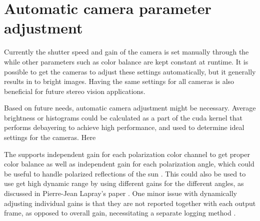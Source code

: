 \section{Automatic camera parameter adjustment}
Currently the shutter speed and gain of the camera is set manually through the \srgui while other parameters such as color balance are kept constant at runtime.
It is possible to get the cameras to adjust these settings automatically, but it generally results in to bright images.
Having the same settings for all cameras is also beneficial for future stereo vision applications.

Based on future needs, automatic camera adjustment might be necessary.
Average brightness or histograms could be calculated as a part of the \gls{cuda} kernel that performs debayering to achieve high performance, and used to determine ideal settings for the cameras.
Here

The \cams supports independent gain for each polarization color channel to get proper color balance as well as independent gain for each polarization angle, which could be useful to handle polarized reflections of the sun \cite{lucidvisionlabsTritonMPPolarized2020}.
This could also be used to use get high dynamic range by using different gains for the different angles, as discussed in Pierre-Jean Lapray's paper \cite{laprayExploitingRedundancyColorpolarization2020}.
One minor issue with dynamically adjusting individual gains is that they are not reported together with each output frame, as opposed to overall gain, necessitating a separate logging method \cite{lucidvisionlabsTritonMPPolarized2020}.

